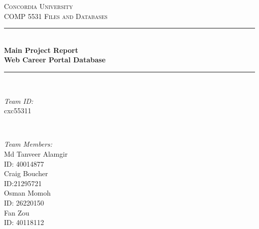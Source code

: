 \documentclass[11pt]{article}
\begin{document}
\begin{titlepage}

\newcommand{\HRule}{\rule{\linewidth}{0.5mm}} %

\center %
 

\textsc{\LARGE Concordia University}\\[1.5cm] %
\textsc{\Large COMP 5531 Files and Databases}\\[0.5cm] %


\HRule \\[0.4cm]
{ \huge \bfseries Main Project Report \\ Web Career Portal Database}\\[0.4cm] %
\HRule \\[1.5cm]
 

\begin{minipage}{0.4\textwidth}
\begin{flushleft} \large
\emph{Team ID:} \\ cxc55311 \\
\end{flushleft}
\end{minipage}
~
\begin{minipage}{0.4\textwidth}
\begin{flushright} \large
\emph{Team Members:} \\
Md Tanveer Alamgir \\ ID: 40014877\\
Craig Boucher \\ ID:21295721 \\
Osman Momoh \\ ID: 26220150\\
Fan Zou \\ ID: 40118112\\


\end{flushright}
\end{minipage}
\end{titlepage}
\end{document}
